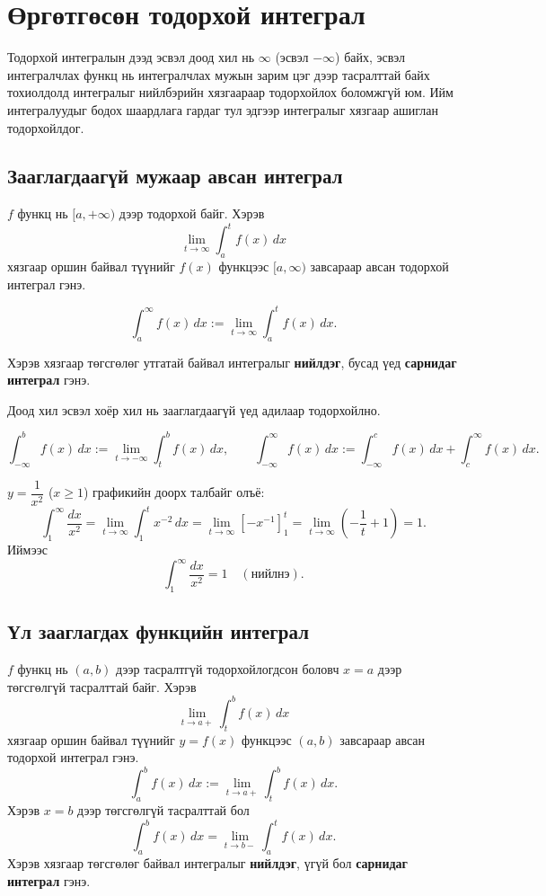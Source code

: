 \chapter{Өргөтгөсөн тодорхой интеграл}

Тодорхой интегралын дээд эсвэл доод хил нь $\infty$ (эсвэл $-\infty$) байх, эсвэл 
интегралчлах функц нь интегралчлах мужын зарим цэг дээр тасралттай байх 
тохиолдолд интегралыг нийлбэрийн хязгаараар тодорхойлох боломжгүй юм. 
Ийм интегралуудыг бодох шаардлага гардаг тул эдгээр интегралыг хязгаар ашиглан тодорхойлдог.

\section{Зааглагдаагүй мужаар авсан интеграл}

\begin{definition}
$f$ функц нь $[a,+\infty)$ дээр тодорхой байг. Хэрэв
\[
\lim_{t\to\infty}\int_a^{t} f(x)\,dx
\]
хязгаар оршин байвал түүнийг $f(x)$ функцээс $[a,\infty)$ завсараар авсан тодорхой интеграл гэнэ.  

\[
\int_a^{\infty} f(x)\,dx := \lim_{t\to\infty}\int_a^{t}f(x)\,dx.
\]

Хэрэв хязгаар төгсгөлөг утгатай байвал интегралыг \textbf{нийлдэг}, бусад үед \textbf{сарнидаг интеграл} гэнэ.
\end{definition}

Доод хил эсвэл хоёр хил нь зааглагдаагүй үед адилаар тодорхойлно.

\[
\int_{-\infty}^{b} f(x)\,dx := \lim_{t\to -\infty}\int_t^{b}f(x)\,dx,
\qquad
\int_{-\infty}^{\infty} f(x)\,dx := 
\int_{-\infty}^{c} f(x)\,dx + \int_{c}^{\infty} f(x)\,dx.
\]

\begin{example}\label{x^{-2}}
$y=\dfrac{1}{x^2}$ ($x\ge1$) графикийн доорх талбайг олъё:
\[
\int_{1}^{\infty} \frac{dx}{x^2}
= \lim_{t\to\infty}\int_{1}^{t} x^{-2}\,dx
= \lim_{t\to\infty}\left[-x^{-1}\right]_{1}^{t}
= \lim_{t\to\infty}\left( -\frac{1}{t} + 1\right)
= 1.
\]
Иймээс
\[
\int_{1}^{\infty}\frac{dx}{x^2} = 1 \quad (\text{нийлнэ}).
\]
\end{example}

\section{Үл зааглагдах функцийн интеграл}

\begin{definition}
$f$ функц нь $(a,b)$ дээр тасралтгүй тодорхойлогдсон боловч $x=a$ дээр төгсгөлгүй тасралттай байг.  
Хэрэв
\[
\lim_{t\to a+}\int_{t}^{b} f(x)\,dx
\]
хязгаар оршин байвал түүнийг $y=f(x)$ функцээс $(a,b)$ завсараар авсан тодорхой интеграл гэнэ.
\[
\int_{a}^{b} f(x)\,dx := \lim_{t\to a+}\int_{t}^{b}f(x)\,dx.
\]
Хэрэв $x=b$ дээр төгсгөлгүй тасралттай бол
\[
\int_a^{b}f(x)\,dx = \lim_{t\to b-}\int_{a}^{t} f(x)\,dx.
\]
Хэрэв хязгаар төгсгөлөг байвал интегралыг \textbf{нийлдэг}, үгүй бол \textbf{сарнидаг интеграл} гэнэ.
\end{definition}

